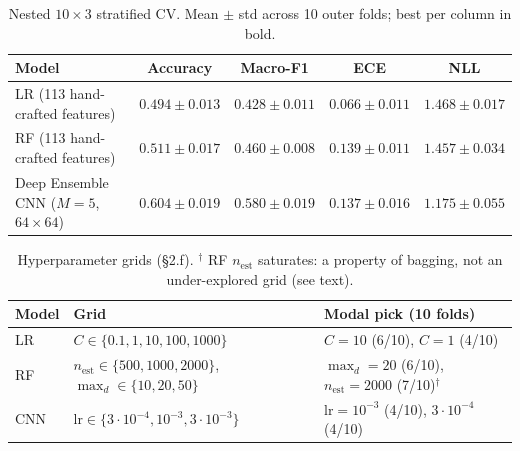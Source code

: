 \documentclass[10pt,a4paper]{article}
\begin{document}
\begin{table}[h]
\centering\footnotesize
\setlength{\tabcolsep}{6pt}
\begin{tabular}{lcccc}
\toprule
Model & Accuracy & Macro-F1 & ECE & NLL \\
\midrule
LR (113 hand-crafted features) & $0.494\pm 0.013$ & $0.428\pm 0.011$ & $\mathbf{0.066\pm 0.011}$ & $1.468\pm 0.017$ \\
RF (113 hand-crafted features) & $0.511\pm 0.017$ & $0.460\pm 0.008$ & $0.139\pm 0.011$ & $1.457\pm 0.034$ \\
Deep Ensemble CNN ($M{=}5$, $64{\times}64$) & $\mathbf{0.604\pm 0.019}$ & $\mathbf{0.580\pm 0.019}$ & $0.137\pm 0.016$ & $\mathbf{1.175\pm 0.055}$ \\
\bottomrule
\end{tabular}
\caption{Nested $10\!\times\!3$ stratified CV. Mean $\pm$ std across 10 outer folds; best per column in bold.}\label{tab:agg}
\end{table}

\begin{table}[h]
\centering\footnotesize
\setlength{\tabcolsep}{6pt}
\begin{tabular}{lll}
\toprule
Model & Grid & Modal pick (10 folds) \\
\midrule
LR & $C\!\in\!\{0.1,1,10,100,1000\}$ & $C{=}10$ (6/10), $C{=}1$ (4/10) \\
RF & $n_{\text{est}}\!\in\!\{500,1000,2000\}$, $\max_d\!\in\!\{10,20,50\}$ & $\max_d{=}20$ (6/10), $n_{\text{est}}{=}2000$ (7/10)$^\dagger$ \\
CNN & $\text{lr}\!\in\!\{3{\cdot}10^{-4},10^{-3},3{\cdot}10^{-3}\}$ & $\text{lr}{=}10^{-3}$ (4/10), $3{\cdot}10^{-4}$ (4/10) \\
\bottomrule
\end{tabular}
\caption{Hyperparameter grids (\S 2.f). $^\dagger$ RF $n_{\text{est}}$ saturates: a property of bagging, not an under-explored grid (see text).}\label{tab:hps}
\end{table}
\end{document}
